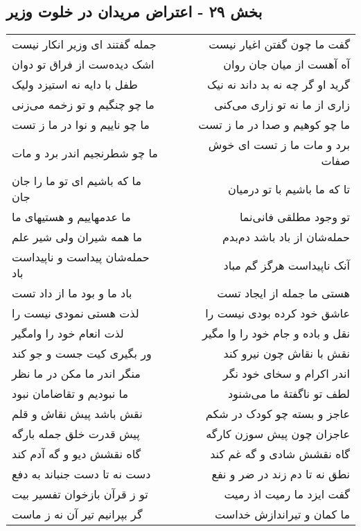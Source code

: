 \begin{center}
\section*{بخش ۲۹ - اعتراض مریدان در خلوت وزیر}
\label{sec:sh029}
\begin{longtable}{l p{0.5cm} r}
جمله گفتند ای وزیر انکار نیست
&&
گفت ما چون گفتن اغیار نیست
\\
اشک دیده‌ست از فراق تو دوان
&&
آه آهست از میان جان روان
\\
طفل با دایه نه استیزد ولیک
&&
گرید او گر چه نه بد داند نه نیک
\\
ما چو چنگیم و تو زخمه می‌زنی
&&
زاری از ما نه تو زاری می‌کنی
\\
ما چو ناییم و نوا در ما ز تست
&&
ما چو کوهیم و صدا در ما ز تست
\\
ما چو شطرنجیم اندر برد و مات
&&
برد و مات ما ز تست ای خوش صفات
\\
ما که باشیم ای تو ما را جان جان
&&
تا که ما باشیم با تو درمیان
\\
ما عدمهاییم و هستیهای ما
&&
تو وجود مطلقی فانی‌نما
\\
ما همه شیران ولی شیر علم
&&
حمله‌شان از باد باشد دم‌بدم
\\
حمله‌شان پیداست و ناپیداست باد
&&
آنک ناپیداست هرگز گم مباد
\\
باد ما و بود ما از داد تست
&&
هستی ما جمله از ایجاد تست
\\
لذت هستی نمودی نیست را
&&
عاشق خود کرده بودی نیست را
\\
لذت انعام خود را وامگیر
&&
نقل و باده و جام خود را وا مگیر
\\
ور بگیری کیت جست و جو کند
&&
نقش با نقاش چون نیرو کند
\\
منگر اندر ما مکن در ما نظر
&&
اندر اکرام و سخای خود نگر
\\
ما نبودیم و تقاضامان نبود
&&
لطف تو ناگفتهٔ ما می‌شنود
\\
نقش باشد پیش نقاش و قلم
&&
عاجز و بسته چو کودک در شکم
\\
پیش قدرت خلق جمله بارگه
&&
عاجزان چون پیش سوزن کارگه
\\
گاه نقشش دیو و گه آدم کند
&&
گاه نقشش شادی و گه غم کند
\\
دست نه تا دست جنباند به دفع
&&
نطق نه تا دم زند در ضر و نفع
\\
تو ز قرآن بازخوان تفسیر بیت
&&
گفت ایزد ما رمیت اذ رمیت
\\
گر بپرانیم تیر آن نه ز ماست
&&
ما کمان و تیراندازش خداست
\\

\end{longtable}
\end{center}

